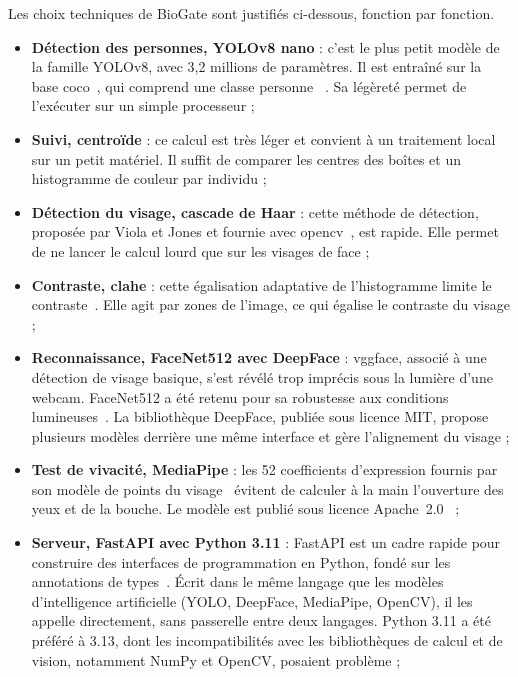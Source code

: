 \begin{maj}
Les choix techniques de BioGate sont justifiés ci-dessous, fonction par fonction.

\begin{itemize}
  \item \textbf{Détection des personnes, YOLOv8 nano} : c'est le plus petit modèle de la famille YOLOv8, avec 3,2 millions de paramètres. Il est entraîné sur la base \gls{coco}~\cite{lin2014coco}, qui comprend une classe \og personne \fg{}~\cite{ultralytics_yolov8docs}. Sa légèreté permet de l'exécuter sur un simple processeur ;
  \item \textbf{Suivi, centroïde} : ce calcul est très léger et convient à un traitement local sur un petit matériel. Il suffit de comparer les centres des boîtes et un histogramme de couleur par individu ;
  \item \textbf{Détection du visage, cascade de Haar} : cette méthode de détection, proposée par Viola et Jones et fournie avec \gls{opencv}~\cite{viola2001rapid,opencv_cascade}, est rapide. Elle permet de ne lancer le calcul lourd que sur les visages de face ;
  \item \textbf{Contraste, \gls{clahe}} : cette égalisation adaptative de l'histogramme limite le contraste~\cite{zuiderveld1994clahe,opencv_clahe}. Elle agit par zones de l'image, ce qui égalise le contraste du visage ;
  \item \textbf{Reconnaissance, FaceNet512 avec DeepFace} : \gls{vggface}, associé à une détection de visage basique, s'est révélé trop imprécis sous la lumière d'une webcam. FaceNet512 a été retenu pour sa robustesse aux conditions lumineuses~\cite{schroff2015facenet,serengil_deepface}. La bibliothèque DeepFace, publiée sous licence MIT, propose plusieurs modèles derrière une même interface et gère l'alignement du visage ;
  \item \textbf{Test de vivacité, MediaPipe} : les 52 coefficients d'expression fournis par son modèle de points du visage~\cite{google_facelandmarker} évitent de calculer à la main l'ouverture des yeux et de la bouche. Le modèle est publié sous licence Apache~2.0~\cite{mediapipe_blendshape_card} ;
  \item \textbf{Serveur, FastAPI avec Python 3.11} : FastAPI est un cadre rapide pour construire des interfaces de programmation en Python, fondé sur les annotations de types~\cite{fastapi_docs}. Écrit dans le même langage que les modèles d'intelligence artificielle (YOLO, DeepFace, MediaPipe, OpenCV), il les appelle directement, sans passerelle entre deux langages. Python 3.11 a été préféré à 3.13, dont les incompatibilités avec les bibliothèques de calcul et de vision, notamment NumPy et OpenCV, posaient problème ;

\end{itemize}
\end{maj}
